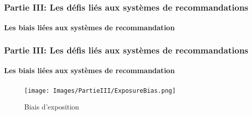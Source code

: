 \begin{frame}

    \frametitle{Partie III: Les défis liés aux systèmes de recommandations}
    \framesubtitle{Les biais liées aux systèmes de recommandation}

    \begin{figure}
        \centering
    \end{figure}

\end{frame}

\begin{frame}

    \frametitle{Partie III: Les défis liés aux systèmes de recommandations}
    \framesubtitle{Les biais liées aux systèmes de recommandation}

    \begin{figure}
        \centering
        \texttt{[image: Images/PartieIII/ExposureBias.png]}
        \caption{Biais d'exposition}
    \end{figure}

\end{frame}

